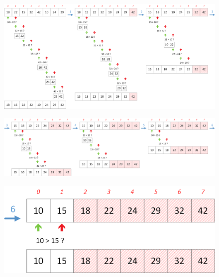 \documentclass[11pt,a4paper]{article}
\begin{document}

\begin{figure}[ht!]
\centering
\centerline{
\includegraphics[width=1.2\textwidth]{img/BubbleSort_part1.png}
}
\end{figure}

\begin{figure}[ht!]
\centering
\centerline{
\includegraphics[width=1.2\textwidth]{img/BubbleSort_part2_1.png}
}
\end{figure}


\begin{figure}[ht!]
\centering
\centerline{
\includegraphics[scale=0.48]{img/BubbleSort_part2_2.png}
}
\end{figure}
\end{document}

